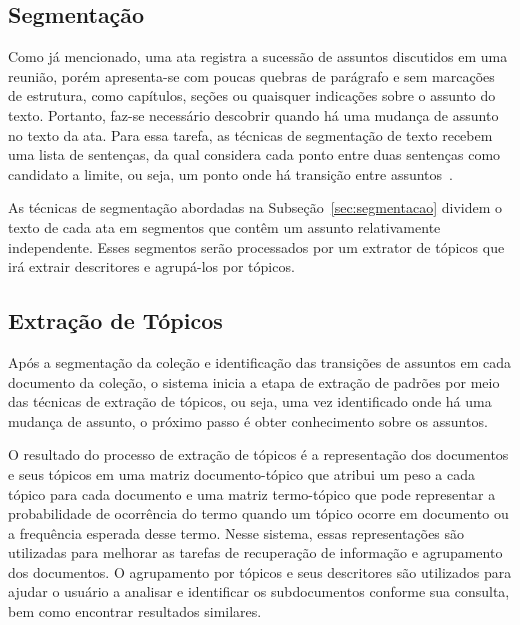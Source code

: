 







\subsection{Segmentação}

Como já mencionado, uma ata registra a sucessão de assuntos discutidos em uma reunião, porém apresenta-se com poucas quebras de parágrafo e sem marcações de estrutura, como capítulos, seções ou quaisquer indicações sobre o assunto do texto. Portanto, faz-se necessário descobrir quando há uma mudança de assunto no texto da ata. Para essa tarefa, as técnicas de segmentação de texto recebem uma lista de sentenças, da qual considera cada ponto entre duas sentenças como candidato a limite, ou seja, um ponto onde há transição entre assuntos~\cite{Bokaei2015, Bokaei2016, Misra2009, Sakahara2014}.


As técnicas de segmentação abordadas na Subseção~\ref{sec:segmentacao} dividem o texto de cada ata em segmentos que contêm um assunto relativamente independente. Esses segmentos serão processados por um extrator de tópicos que irá extrair descritores e agrupá-los por tópicos.





\subsection{Extração de Tópicos}

Após a segmentação da coleção e identificação das transições de assuntos em cada documento da coleção, o sistema inicia a etapa de extração de padrões por meio das técnicas de extração de tópicos, ou seja, uma vez identificado onde há uma mudança de assunto, o próximo passo é obter conhecimento sobre os assuntos.

O resultado do processo de extração de tópicos é a representação dos documentos e seus tópicos em uma matriz documento-tópico que atribui um peso a cada tópico para cada documento e uma matriz termo-tópico que pode representar a probabilidade de ocorrência do termo quando um tópico ocorre em documento ou a frequência esperada desse termo.  
Nesse sistema, essas representações são utilizadas para melhorar as tarefas de recuperação de informação e agrupamento dos documentos. 
O agrupamento por tópicos e seus descritores são utilizados para ajudar o usuário a analisar e identificar os subdocumentos conforme sua consulta, bem como encontrar resultados similares.

